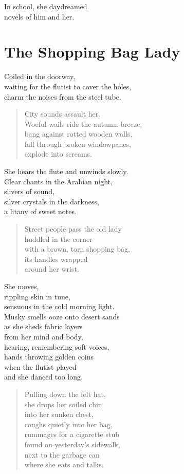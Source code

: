 \documentclass[twoside,10pt]{book}
\begin{document}
In school, she daydreamed\\
novels of him and her.


\clearpage
\section{The Shopping Bag Lady}

Coiled in the doorway,\\
waiting for the flutist to cover the holes,\\
charm the noises from the steel tube.

\begin{quote}
City sounds assault her.\\
Woeful wails ride the autumn breeze,\\
bang against rotted wooden walls,\\
fall through broken windowpanes,\\
explode into screams.
\end{quote}

She hears the flute and unwinds slowly.\\
Clear chants in the Arabian night,\\
slivers of sound,\\
silver crystals in the darkness,\\
a litany of sweet notes.

\begin{quote}
Street people pass the old lady\\
huddled in the corner\\
with a brown, torn shopping bag,\\
its handles wrapped\\
around her wrist.
\end{quote}

She moves,\\
rippling skin in tune,\\
sensuous in the cold morning light.\\
Musky smells ooze onto desert sands\\
as she sheds fabric layers\\
from her mind and body,\\
hearing, remembering soft voices,\\
hands throwing golden coins\\
when the flutist played\\
and she danced too long.

\begin{quote}
Pulling down the felt hat,\\
she drops her soiled chin\\
into her sunken chest,\\
coughs quietly into her bag,\\
\clearpage
rummages for a cigarette stub\\
found on yesterday's sidewalk,\\
next to the garbage can\\
where she eats and talks.
\end{quote}
\end{document}
